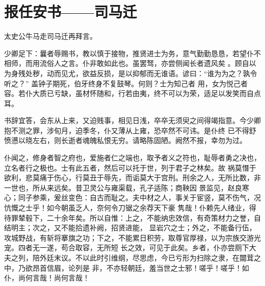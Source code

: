 \section{报任安书——司马迁}

太史公牛马走司马迁再拜言。


少卿足下：曩者辱赐书，教以慎于接物，推贤进士为务，意气勤勤恳恳，若望仆不相师，而用流俗人之言。仆非敢如此也。虽罢驽，亦尝侧闻长者遗风矣
。顾自以为身残处秽，动而见尤，欲益反损，是以抑郁而无谁语。谚曰：“谁为为之？孰令听之？” 盖钟子期死，伯牙终身不复鼓琴。何则？士为知己者
用，女为悦己者容。若仆大质已亏缺，虽材怀随和，行若由夷，终不可以为荣，适足以发笑而自点耳。


书辞宜答，会东从上来，又迫贱事，相见日浅，卒卒无须臾之间得竭指意。今少卿抱不测之罪，涉旬月，迫季冬，仆又薄从上雍，恐卒然不可讳。是仆终
已不得舒愤懑以晓左右，则长逝者魂魄私恨无穷。请略陈固陋。阙然不报，幸勿为过。


仆闻之，修身者智之府也，爱施者仁之端也，取予者义之符也，耻辱者勇之决也，立名者行之极也。士有此五者，然后可以托于世，列于君子之林矣。故
祸莫憯于欲利，悲莫痛于伤心，行莫丑于辱先，而诟莫大于宫刑。刑余之人，无所比数，非一世也，所从来远矣。昔卫灵公与雍渠载，孔子适陈；商鞅因
景监见，赵良寒心；同子参乘，爰丝变色：自古而耻之。夫中材之人，事关于宦竖，莫不伤气，况忼慨之士乎！如今朝虽乏人，奈何令刀锯之余荐天下豪
隽哉！仆赖先人绪业，得待罪辇毂下，二十余年矣。所以自惟：上之，不能纳忠效信，有奇策材力之誉，自结明主；次之，又不能拾遗补阙，招贤进能，
显岩穴之士；外之，不能备行伍，攻城野战，有斩将搴旗之功；下之，不能累日积劳，取尊官厚禄，以为宗族交游光宠。四者无一遂，苟合取容，无所短
长之效，可见于此矣。乡者，仆亦尝厕下大夫之列，陪外廷末议。不以此时引维纲，尽思虑，今已亏形为扫除之隶，在闒茸之中，乃欲昂首信眉，论列是
非，不亦轻朝廷，羞当世之士邪！嗟乎！嗟乎！如仆，尚何言哉！尚何言哉！


